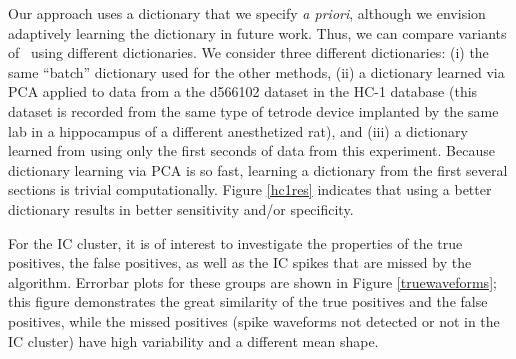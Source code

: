 Our approach uses a dictionary that we specify \emph{a priori}, although we envision adaptively learning the dictionary in future work. Thus, we can compare variants of \smug~using different dictionaries.  We consider three different dictionaries: (i) the same ``batch'' dictionary used for the other methods, (ii) a dictionary learned via PCA applied to data from a the d566102 dataset in the HC-1 database (this dataset is recorded from the same type of tetrode device implanted by the same lab in a hippocampus of a different anesthetized rat), and (iii) a dictionary learned from using only the first  seconds of data from this experiment.  Because dictionary learning via PCA is so fast, learning a dictionary from the first several sections is trivial computationally.  Figure \ref{hc1res} indicates that using a better dictionary results in better sensitivity and/or specificity. 



For the IC cluster, it is of interest to investigate the properties of the true positives, the false positives, as well as the IC spikes that are missed by the algorithm.  Errorbar plots for these groups are shown in Figure \ref{truewaveforms}; this figure demonstrates the great similarity of the true positives and the false positives, while the missed positives (spike waveforms not detected or not in the IC cluster) have high variability and a different mean shape. 
 
